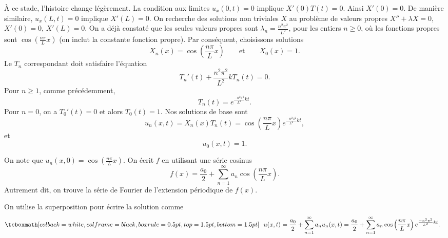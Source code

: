 À ce stade, l'histoire change légèrement.
La condition aux limites $u_x(0,t) = 0$ implique  $X'(0)T(t) = 0$.
Ainsi $X'(0) = 0$.  De manière similaire,  $u_x(L,t) = 0$ implique $X'(L) = 0$.  On
recherche des solutions non triviales $ X $ au problème de valeurs propres
$X'' + \lambda X = 0$, $X'(0) = 0$, $X'(L) = 0$.  On a déjà constaté que
les seules valeurs propres sont $\lambda_n = \frac{n^2 \pi^2}{L^2}$,  pour les entiers
$n \geq 0$,
où les fonctions propres sont $\cos \left( \frac{n \pi}{L} x\right)$
(on inclut la constante
fonction propre).  Par conséquent,  choisissons
solutions
\begin{equation*}
X_n (x) = \cos \left( \frac{n \pi}{L} x \right)
\qquad \text{et} \qquad
X_0 (x) = 1.
\end{equation*}
Le $ T_n $ correspondant doit satisfaire l'équation
\begin{equation*}
T_n'(t) + \frac{n^2 \pi^2}{L^2} k T_n(t) = 0 .
\end{equation*}
Pour $n \geq 1$,  comme précédemment,
\begin{equation*}
T_n(t) = e^{\frac{-n^2 \pi^2}{L^2} k t} .
\end{equation*}
Pour $n = 0$,  on a $T_0'(t) = 0$ et alors $T_0(t) = 1$.
Nos solutions de base sont
\begin{equation*}
u_n(x,t) = X_n(x)T_n(t) =
\cos \left( \frac{n \pi}{L} x \right)
e^{\frac{-n^2 \pi^2}{L^2} k t} ,
\end{equation*}
et
\begin{equation*}
u_0(x,t) = 1 .
\end{equation*}

On note que $u_n(x,0) = \cos \left( \frac{n \pi}{L} x \right)$.  On écrit $f$ en utilisant une série cosinus 
\begin{equation*}
f(x) = \frac{a_0}{2} + \sum_{n=1}^\infty a_n \cos \left( \frac{n \pi}{L} x
\right) .
\end{equation*}
Autrement dit,  on trouve la série de Fourier de l'extension  périodique de $f(x)$.

On utilise la superposition pour écrire la solution comme
\begin{equation*}
\mybxbg{~~
u(x,t) = 
\frac{a_0}{2} + 
\sum_{n=1}^\infty
a_n
u_n(x,t)
=
\frac{a_0}{2} + 
\sum_{n=1}^\infty
a_n
\cos \left( \frac{n \pi}{L} x \right)
e^{\frac{-n^2 \pi^2}{L^2} k t} .
~~}
\end{equation*}

